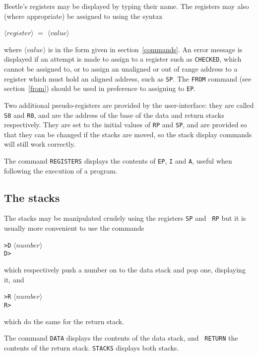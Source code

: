 \documentclass{article}
\newcommand{\angb}[1]{$\langle #1\rangle$}
\begin{document}
Beetle's registers may be displayed by typing their name. The
registers may also (where appropriate) be assigned to using the syntax

\begin{center}\angb{register} $=$ \angb{value}\end{center}

where \angb{value} is in the form given in section~\ref{commands}. An error
message is displayed if an attempt is made to assign to a register such as
{\tt CHECKED}, which cannot be assigned to, or to assign an unaligned or out
of range address to a register which must hold an aligned address, such as
{\tt SP}. The {\tt FROM} command (see section~\ref{from}) should be used in
preference to assigning to {\tt EP}.

Two additional pseudo-registers are provided by the user-interface: they are
called {\tt S0} and {\tt R0}, and are the address of the base of the data and
return stacks respectively. They are set to the initial values of {\tt RP}
and {\tt SP}, and are provided so that they can be changed if the stacks are
moved, so the stack display commands will still work correctly.

The command {\tt REGISTERS} displays the contents of {\tt EP}, {\tt I} and
{\tt A}, useful when following the execution of a program.

\subsection{The stacks}

The stacks may be manipulated crudely using the registers {\tt SP} and {\tt
RP} but it is usually more convenient to use the commands

\begin{center}
{\tt >D} \angb{number}\\
{\tt D>}
\end{center}

which respectively push a number on to the data stack and pop one, displaying
it, and

\begin{center}
{\tt >R} \angb{number}\\
{\tt R>}
\end{center}

which do the same for the return stack.

The command {\tt DATA} displays the contents of the data stack, and {\tt
RETURN} the contents of the return stack. {\tt STACKS} displays both stacks.
\end{document}
